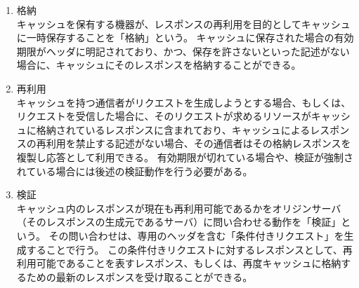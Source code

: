 \documentclass[12pt,a4paper]{jbook}
\begin{document}
\begin{enumerate}
\item 格納\\
キャッシュを保有する機器が、レスポンスの再利用を目的としてキャッシュに一時保存することを「格納」という。
キャッシュに保存された場合の有効期限がヘッダに明記されており、かつ、保存を許さないといった記述がない場合に、キャッシュにそのレスポンスを格納することができる。
\item 再利用\\
キャッシュを持つ通信者がリクエストを生成しようとする場合、もしくは、リクエストを受信した場合に、そのリクエストが求めるリソースがキャッシュに格納されているレスポンスに含まれており、キャッシュによるレスポンスの再利用を禁止する記述がない場合、その通信者はその格納レスポンスを複製し応答として利用できる。
有効期限が切れている場合や、検証が強制されている場合には後述の検証動作を行う必要がある。
\item 検証\\
キャッシュ内のレスポンスが現在も再利用可能であるかをオリジンサーバ（そのレスポンスの生成元であるサーバ）に問い合わせる動作を「検証」という。
その問い合わせは、専用のヘッダを含む「条件付きリクエスト」を生成することで行う。
この条件付きリクエストに対するレスポンスとして、再利用可能であることを表すレスポンス、もしくは、再度キャッシュに格納するための最新のレスポンスを受け取ることができる。
\end{enumerate}

\begin{comment}
\subsection{キャッシュを利用する攻撃}
\label{sec:bcpattack}
キャッシュを利用した攻撃の一例としてBrowser Cache Poisoning攻撃（以下、「BCP攻撃」とする）\cite{bcpattack}を取り上げる。
BCP攻撃はクライアントとサーバの経路上に攻撃者である第三者が割り込んで行う、中間者攻撃に該当する。
このBCP攻撃の基本的な手順は以下の通りである。
\begin{enumerate}
\item 攻撃者はクライアントとサーバ間の通信経路上に割り込む
\item サーバからクライアントへ送信されるレスポンスのヘッダとリソースを書きかえる
\item 通信経路上のキャッシュ（クライアントもしくは中継者のキャッシュ）にその書き換えたレスポンスを格納させる
\item 今後、クライアントはそのリソースを使用しようとする度にキャッシュによる再利用が発生し、攻撃者によって書き換えられたリソースを受け取ることになる
\end{enumerate}

BCP攻撃の特徴は、まず攻撃者が実際に行動するのはレスポンスの書き換えを行う一度きりであるのに対し、その影響は以降の通信全てに影響することである。
また、攻撃が可能な対象が通信プロトコルの一つのHTTP（\ref{sec:http}章参照）や、暗号通信プロトコルHTTPS（\ref{sec:https}節参照）である。
これらは現在広くウェブで使用されておりBCP攻撃の危険性は高くなっている一方で、このBCP攻撃の対策法は固まっておらず速やかな解析が求められている。
\end{comment}
\end{document}
